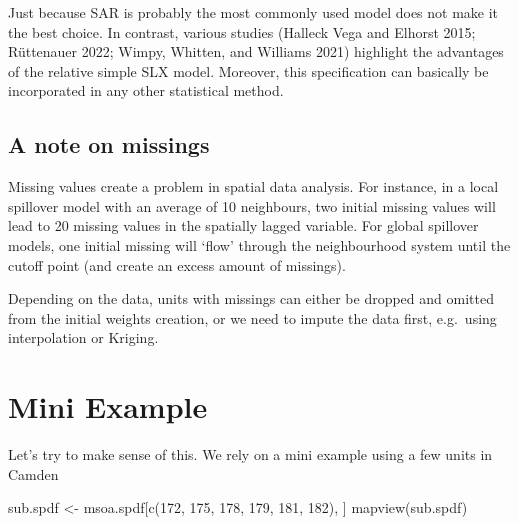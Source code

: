\documentclass[
  letterpaper,
]{scrbook}
\newenvironment{Shaded}{\begin{snugshade}}{\end{snugshade}}
\newcommand{\DecValTok}[1]{\textcolor[rgb]{0.68,0.00,0.00}{#1}}
\newcommand{\FunctionTok}[1]{\textcolor[rgb]{0.28,0.35,0.67}{#1}}
\newcommand{\NormalTok}[1]{\textcolor[rgb]{0.00,0.23,0.31}{#1}}
\newcommand{\OtherTok}[1]{\textcolor[rgb]{0.00,0.23,0.31}{#1}}
\begin{document}
Just because SAR is probably the most commonly used model does not make
it the best choice. In contrast, various studies (Halleck Vega and
Elhorst 2015; Rüttenauer 2022; Wimpy, Whitten, and Williams 2021)
highlight the advantages of the relative simple SLX model. Moreover,
this specification can basically be incorporated in any other
statistical method.

\hypertarget{a-note-on-missings}{%
\subsection{A note on missings}\label{a-note-on-missings}}

Missing values create a problem in spatial data analysis. For instance,
in a local spillover model with an average of 10 neighbours, two initial
missing values will lead to 20 missing values in the spatially lagged
variable. For global spillover models, one initial missing will `flow'
through the neighbourhood system until the cutoff point (and create an
excess amount of missings).

Depending on the data, units with missings can either be dropped and
omitted from the initial weights creation, or we need to impute the data
first, e.g.~using interpolation or Kriging.

\hypertarget{mini-example}{%
\section{Mini Example}\label{mini-example}}

Let's try to make sense of this. We rely on a mini example using a few
units in Camden

\begin{Shaded}
\begin{Highlighting}[]
\NormalTok{sub.spdf }\OtherTok{\textless{}{-}}\NormalTok{ msoa.spdf[}\FunctionTok{c}\NormalTok{(}\DecValTok{172}\NormalTok{, }\DecValTok{175}\NormalTok{, }\DecValTok{178}\NormalTok{, }\DecValTok{179}\NormalTok{, }\DecValTok{181}\NormalTok{, }\DecValTok{182}\NormalTok{), ]}
\FunctionTok{mapview}\NormalTok{(sub.spdf)}
\end{Highlighting}
\end{Shaded}
\end{document}

